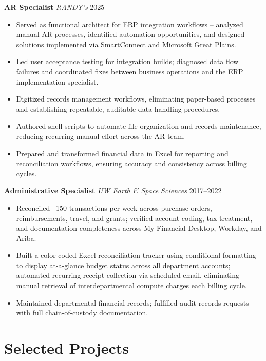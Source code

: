 \documentclass[11pt,a4paper]{article}
\begin{document}
\textbf{AR Specialist} \hfill \textit{RANDY's} \hfill 2025
\begin{itemize}
  \item Served as functional architect for ERP integration workflows -- analyzed manual AR processes,
        identified automation opportunities, and designed solutions implemented via SmartConnect
        and Microsoft Great Plains.
  \item Led user acceptance testing for integration builds; diagnosed data flow failures and
        coordinated fixes between business operations and the ERP implementation specialist.
  \item Digitized records management workflows, eliminating paper-based processes and establishing
        repeatable, auditable data handling procedures.
  \item Authored shell scripts to automate file organization and records maintenance, reducing
        recurring manual effort across the AR team.
  \item Prepared and transformed financial data in Excel for reporting and reconciliation workflows,
        ensuring accuracy and consistency across billing cycles.
\end{itemize}

\vspace{0.4em}
\textbf{Administrative Specialist} \hfill \textit{UW Earth \& Space Sciences} \hfill 2017--2022
\begin{itemize}
  \item Reconciled ~150 transactions per week across purchase orders, reimbursements, travel,
        and grants; verified account coding, tax treatment, and documentation completeness
        across My Financial Desktop, Workday, and Ariba.
  \item Built a color-coded Excel reconciliation tracker using conditional formatting to display
        at-a-glance budget status across all department accounts; automated recurring receipt
        collection via scheduled email, eliminating manual retrieval of interdepartmental
        compute charges each billing cycle.
  \item Maintained departmental financial records; fulfilled audit records requests with full
        chain-of-custody documentation.
\end{itemize}


\section*{Selected Projects}
\end{document}

